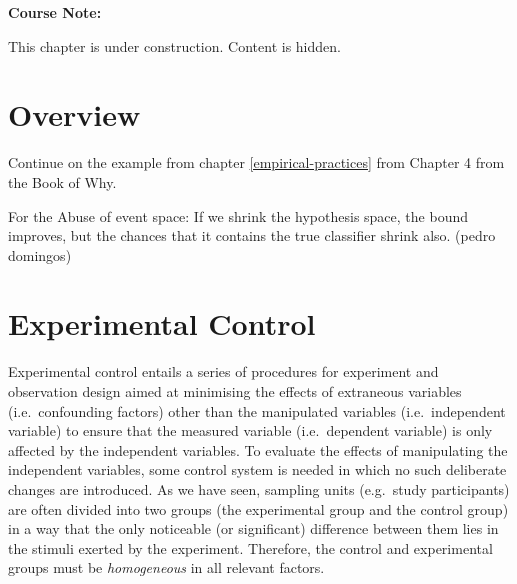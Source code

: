 \documentclass[
]{book}
\begin{document}
\begin{notebox}

\begin{center}
\textbf{Course Note:}

\end{center}

This chapter is under construction. Content is hidden.

\end{notebox}

\hypertarget{overview-2}{%
\section{Overview}\label{overview-2}}

Continue on the example from chapter \ref{empirical-practices} from Chapter 4 from the Book of Why.

For the Abuse of event space: If we shrink the hypothesis space, the bound improves, but the chances that it contains the true classifier shrink also. (pedro domingos)

\hypertarget{experimental-control}{%
\section{Experimental Control}\label{experimental-control}}

Experimental control entails a series of procedures for experiment and observation design aimed at minimising the effects of extraneous variables (i.e.~confounding factors) other than the manipulated variables (i.e.~independent variable) to ensure that the measured variable (i.e.~dependent variable) is only affected by the independent variables. To evaluate the effects of manipulating the independent variables, some control system is needed in which no such deliberate changes are introduced. As we have seen, sampling units (e.g.~study participants) are often divided into two groups (the experimental group and the control group) in a way that the only noticeable (or significant) difference between them lies in the stimuli exerted by the experiment.
Therefore, the control and experimental groups must be \emph{homogeneous} in all relevant factors.
\end{document}
